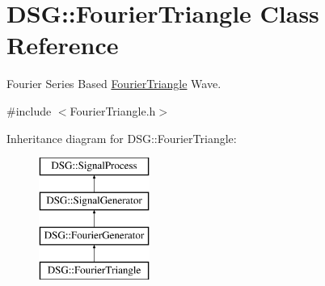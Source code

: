 \hypertarget{classDSG_1_1FourierTriangle}{\section{D\+S\+G\+:\+:Fourier\+Triangle Class Reference}
\label{classDSG_1_1FourierTriangle}
}


Fourier Series Based \hyperlink{classDSG_1_1FourierTriangle}{Fourier\+Triangle} Wave.  




{\ttfamily \#include $<$Fourier\+Triangle.\+h$>$}

Inheritance diagram for D\+S\+G\+:\+:Fourier\+Triangle\+:\begin{figure}[H]
\begin{center}
\leavevmode
\includegraphics[height=4.000000cm]{classDSG_1_1FourierTriangle}
\end{center}
\end{figure}
